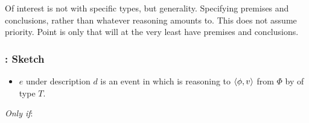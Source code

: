 \begin{note}
  Of interest is not with specific types, but generality.
  Specifying premises and conclusions, rather than whatever reasoning amounts to.
  This does not assume priority.
  Point is only that will at the very least have premises and conclusions.
\end{note}

\subsubsection{: Sketch}
\label{sec:idea}

\begin{note}
  \begin{sketch}[\tR{2}]
    \label{sketch:tR}

    \noindent%

    \begin{itemize}
    \item
      \(e\) under description \(d\) is an event in which \vAgent{} is reasoning to \(\langle \phi, v \rangle\) from \(\Phi\) by \emph{} of type \(T\).
    \end{itemize}

    \emph{Only if}:


\end{sketch}
\end{note}
